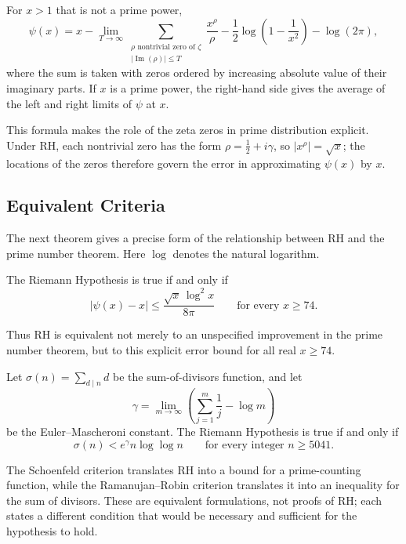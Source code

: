 \begin{theorem}
For $x>1$ that is not a prime power,
\[
 \psi(x)=x-\lim_{T\to\infty}
 \sum_{\substack{\rho\text{ nontrivial zero of }\zeta\\
                  |\operatorname{Im}(\rho)|\leq T}}
 \frac{x^{\rho}}{\rho}
 -\frac12\log\!\left(1-\frac{1}{x^2}\right)-\log(2\pi),
\]
where the sum is taken with zeros ordered by increasing absolute value of their imaginary parts. If $x$ is a prime power, the right-hand side gives the average of the left and right limits of $\psi$ at $x$. \cite[Theorem 2.1]{Broughan2017}
\end{theorem}

This formula makes the role of the zeta zeros in prime distribution explicit. Under RH, each nontrivial zero has the form $\rho=\tfrac12+i\gamma$, so $|x^{\rho}|=\sqrt{x}$; the locations of the zeros therefore govern the error in approximating $\psi(x)$ by $x$.

\subsection{Equivalent Criteria}

The next theorem gives a precise form of the relationship between RH and the prime number theorem. Here $\log$ denotes the natural logarithm.

\begin{theorem}
The Riemann Hypothesis is true if and only if
\[
 |\psi(x)-x|\leq\frac{\sqrt{x}\,\log^2x}{8\pi}
 \qquad\text{for every }x\geq74.
\]
\cite[Theorem 4.9, Section 4.2]{Broughan2017}
\end{theorem}

Thus RH is equivalent not merely to an unspecified improvement in the prime number theorem, but to this explicit error bound for all real $x\geq74$.

\begin{theorem}
Let $\sigma(n)=\sum_{d\mid n}d$ be the sum-of-divisors function, and let
\[
 \gamma=\lim_{m\to\infty}\left(\sum_{j=1}^{m}\frac1j-\log m\right)
\]
be the Euler--Mascheroni constant. The Riemann Hypothesis is true if and only if
\[
 \sigma(n)<e^{\gamma}n\log\log n
 \qquad\text{for every integer }n\geq5041.
\]
\cite[Theorem 7.16, Section 7.9]{Broughan2017}
\end{theorem}

The Schoenfeld criterion translates RH into a bound for a prime-counting function, while the Ramanujan--Robin criterion translates it into an inequality for the sum of divisors. These are equivalent formulations, not proofs of RH; each states a different condition that would be necessary and sufficient for the hypothesis to hold.